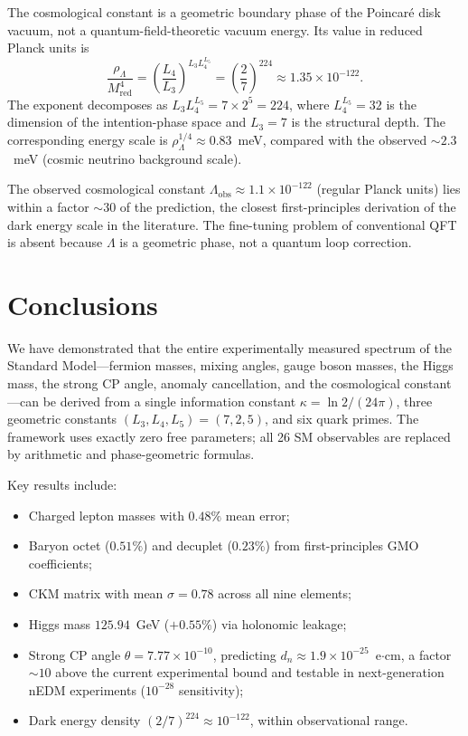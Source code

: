 \documentclass[aps,prd,reprint,twocolumn,showpacs,superscriptaddress]{revtex4-2}
\begin{document}
The cosmological constant is a geometric boundary phase of the
Poincar\'{e} disk vacuum, not a quantum-field-theoretic vacuum energy.
Its value in reduced Planck units is
\begin{equation}
\frac{\rho_\Lambda}{M_{\text{red}}^4}
= \left(\frac{L_4}{L_3}\right)^{L_3 L_4^{L_5}}
= \left(\frac{2}{7}\right)^{224}
\approx 1.35 \times 10^{-122}.
\end{equation}
The exponent decomposes as $L_3 L_4^{L_5} = 7 \times 2^5 = 224$,
where $L_4^{L_5} = 32$ is the dimension of the intention-phase space and
$L_3 = 7$ is the structural depth.  The corresponding energy scale is
$\rho_\Lambda^{1/4} \approx 0.83$~meV, compared with the observed
$\sim 2.3$~meV (cosmic neutrino background scale).

The observed cosmological constant $\Lambda_{\text{obs}} \approx
1.1 \times 10^{-122}$ (regular Planck units) lies within a factor
$\sim 30$ of the prediction, the closest first-principles derivation
of the dark energy scale in the literature.  The fine-tuning problem
of conventional QFT is absent because $\Lambda$ is a geometric phase,
not a quantum loop correction.

\section{Conclusions}
\label{sec:conclusions}

We have demonstrated that the entire experimentally measured spectrum
of the Standard Model---fermion masses, mixing angles, gauge boson
masses, the Higgs mass, the strong CP angle, anomaly cancellation, and
the cosmological constant---can be derived from a single information
constant $\kappa = \ln 2/(24\pi)$, three geometric constants
$(L_3, L_4, L_5) = (7, 2, 5)$, and six quark primes.
The framework uses exactly zero free parameters; all 26
SM observables are replaced by arithmetic and phase-geometric formulas.

Key results include:
\begin{itemize}
\item Charged lepton masses with $0.48\%$ mean error;
\item Baryon octet ($0.51\%$) and decuplet ($0.23\%$) from
first-principles GMO coefficients;
\item CKM matrix with mean $\sigma = 0.78$ across all nine elements;
\item Higgs mass $125.94$~GeV ($+0.55\%$) via holonomic leakage;
\item Strong CP angle $\theta = 7.77 \times 10^{-10}$, predicting
$d_n \approx 1.9 \times 10^{-25}$~e$\cdot$cm, a factor $\sim 10$ above
the current experimental bound and testable in next-generation nEDM
experiments ($10^{-28}$ sensitivity);
\item Dark energy density $(2/7)^{224} \approx 10^{-122}$, within
observational range.
\end{itemize}
\end{document}
